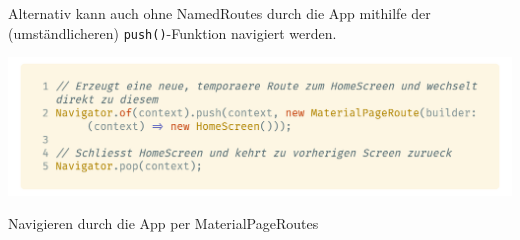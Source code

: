 Alternativ kann auch ohne NamedRoutes durch die App mithilfe der (umständlicheren) \lstinline{push()}-Funktion navigiert 
werden.

\begin{code}
    \centering
    \includegraphics[width=1\textwidth]{images/Flutter/flutterAlternateNavigator.png}
    \vspace{-25pt}
    \caption{Navigieren durch die App per MaterialPageRoutes}
\end{code}